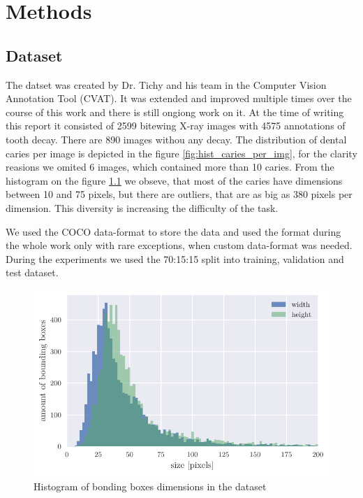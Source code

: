 \chapter{Methods}
\section{Dataset}
The datset was created by Dr. Tichy and his team in the Computer Vision Annotation Tool (CVAT). It was extended and improved multiple times over the course of this work and there is still ongiong work on it. At the time of writing this report it consisted of 2599 bitewing X-ray images with 4575 annotations of tooth decay. There are 890 images withou any decay. The distribution of dental caries per image is depicted in the figure \ref{fig:hist_caries_per_img}, for the clarity reasions we omited 6 images, which contained more than 10 caries. From the histogram on the figure \ref{fig:hist_caries_dim} we obseve, that most of the caries have dimensions between 10 and 75 pixels, but there are outliers, that are as big as 380 pixels per dimension. This diversity is increasing the difficulty of the task.

We used the COCO data-format to store the data and used the format during the whole work only with rare exceptions, when custom data-format was needed. During the experiments we used the 70:15:15 split into training, validation and test dataset.
\begin{figure}
    \includegraphics[width = \linewidth]{images/dataset_histogram.pdf}
    \caption{Histogram of bonding boxes dimensions in the dataset}
    \label{fig:hist_caries_dim}
\end{figure}

